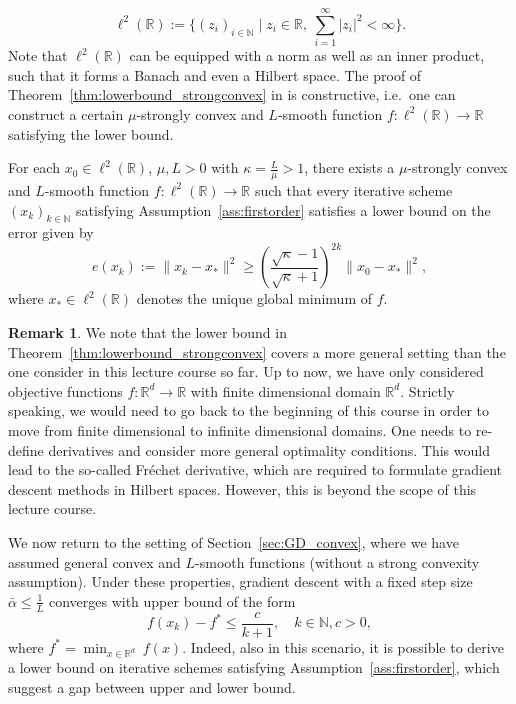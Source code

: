 \documentclass[12pt,openany]{book}
\theoremstyle{definition}
\newtheorem{remark}[thm]{Remark}
\theoremstyle{definition}
\newcommand{\N}{\mathbb{N}}
\newcommand{\R}{\mathbb{R}}
\begin{document}
\[\ell^2(\R) := \{(z_i)_{i\in\N}\mid z_i\in\R,\ \sum_{i=1}^\infty |z_i|^2<\infty\}. \]
Note that $\ell^2(\R)$ can be equipped with a norm as well as an inner product, such that it forms a Banach and even a Hilbert space. The proof of Theorem~\ref{thm:lowerbound_strongconvex} in \cite{N2018} is constructive, i.e.~one can construct a certain $\mu$-strongly convex and $L$-smooth function $f:\ell^2(\R)\to\R$ satisfying the lower bound. 
\begin{thm}\label{thm:lowerbound_strongconvex}
For each $x_0\in\ell^2(\R)$, $\mu,L>0$ with $\kappa = \frac{L}{\mu}>1$, there exists a $\mu$-strongly convex and $L$-smooth function $f:\ell^2(\R)\to\R$ such that every iterative scheme $(x_k)_{k\in\N}$ satisfying Assumption~\ref{ass:firstorder} satisfies a lower bound on the error given by
\[e(x_k) := \|x_k-x_\ast\|^2\ge \left(\frac{\sqrt{\kappa}-1}{\sqrt{\kappa}+1}\right)^{2k} \|x_0-x_\ast\|^2, \]
where $x_\ast\in\ell^2(\R)$ denotes the unique global minimum of $f$.
\end{thm}

\begin{remark}
We note that the lower bound in Theorem~\ref{thm:lowerbound_strongconvex} covers a more general setting than the one  consider in this lecture course so far. Up to now, we have only considered objective functions $f:\R^d\to\R$ with finite dimensional domain $\R^d$.  Strictly speaking, we would need to go back to the beginning of this course in order to move from finite dimensional to infinite dimensional domains.  One needs to re-define derivatives and consider more general optimality conditions. This would lead to the so-called Fréchet derivative, which are required to formulate gradient descent methods in Hilbert spaces.  However, this is beyond the scope of this lecture course.
\end{remark}

We now return to the setting of Section~\ref{sec:GD_convex}, where we have assumed general convex and $L$-smooth functions (without a strong convexity assumption).  Under these properties, gradient descent with a fixed step size $\bar\alpha\le\frac{1}{L}$ converges with upper bound of the form
\[f(x_k)-f^\ast \le \frac{c}{k+1},\quad k\in\N,c>0,\]
where $f^\ast=\min_{x\in\R^d}\ f(x)$.  Indeed, also in this scenario, it is possible to derive a lower bound on iterative schemes satisfying Assumption~\ref{ass:firstorder}, which suggest a gap between upper and lower bound. 
\end{document}

